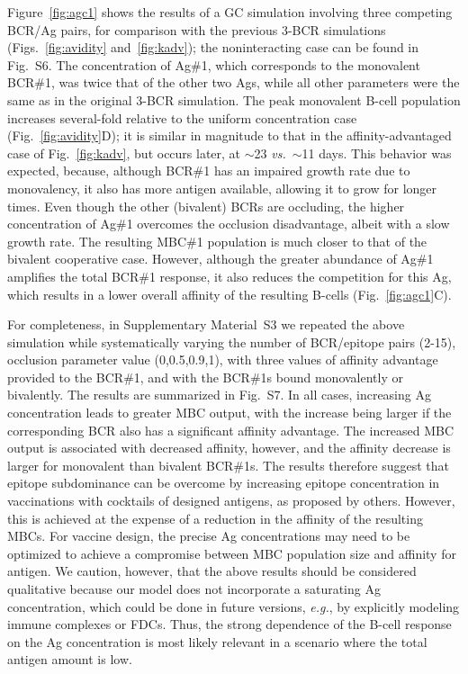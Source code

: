 \documentclass[utf8]{frontiersHLTH}%
\newcommand{\cred}[1]{\textsf{\color{red}#1}}
\newcommand{\vo}[1]{#1} %
\def\eg {{\it e.g.}}
\def\vs {{\it vs.}}
\newcommand{\fig}[1]{Fig.~\ref{fig:#1}}
\newcommand{\figs}[2]{Figs.~\ref{fig:#1} and~\ref{fig:#2}}
\newcommand{\Fig}[1]{Figure~\ref{fig:#1}}
\newcommand{\SI}{Supplementary Material}
\begin{document}
%
\Fig{agc1} shows the results of a GC simulation involving three
competing BCR/Ag pairs, for comparison with the previous 3-BCR simulations (\figs{avidity}{kadv});
the noninteracting case can be found in Fig.~S6.
The concentration of
Ag\#1, which corresponds to the monovalent BCR\#1, was twice that of
the other two Ags, while all other parameters were the same as in the
original 3-BCR simulation. The peak monovalent
B-cell population increases several-fold relative to the uniform concentration
case (\fig{avidity}D); it is similar in magnitude to that in the
affinity-advantaged case of \fig{kadv}, but occurs later, at $\sim$23 \vs~$\sim$11 days. This
behavior was expected, because, although BCR\#1 has an impaired
growth rate due to monovalency, it also has more antigen available, allowing it
to grow for longer times. Even though the other (bivalent) BCRs are
occluding, the higher concentration of Ag\#1 overcomes the occlusion disadvantage,
albeit with a slow growth rate. The resulting MBC\#1 population
is much closer to that of the bivalent cooperative case.
However, although the greater abundance of Ag\#1 amplifies the total BCR\#1
response, it also reduces the competition for this Ag, which results in
a lower overall affinity of the resulting B-cells (\fig{agc1}C).

For completeness, in \SI~S3 we repeated the above simulation while systematically varying the
number of BCR/epitope pairs \vo{(2-15)}, occlusion parameter value \vo{(0,0.5,0.9,1)}, with
three values of affinity advantage provided to the
BCR\#1, and with the BCR\#1s bound monovalently or bivalently. The results are summarized in Fig.~S7.
In all cases, increasing Ag concentration leads to
greater MBC output, with the increase being larger if the
corresponding BCR also has a significant affinity advantage.
The increased MBC output is associated with decreased affinity, however, and the affinity decrease
is larger for monovalent than bivalent
BCR\#1s. The results therefore suggest that
epitope subdominance can be overcome by increasing epitope concentration
in vaccinations with cocktails of designed antigens, as proposed by
others.\cite{kanekiyo19,cohen21,glanville20}  However, this is \vo{achieved} at the expense of a
reduction in the affinity of the resulting MBCs.
For vaccine design, the precise Ag concentrations may need to be 
optimized to achieve a compromise between MBC population
size and affinity for antigen.
%
\cred{
We caution, however, that the above results should be considered qualitative
because our model does not incorporate a saturating Ag concentration, which could be done 
in future versions, \eg, by explicitly modeling immune complexes or FDCs.
Thus, the strong dependence of the B-cell response on the Ag concentration
is most likely relevant in a scenario where the total antigen amount is low.
}
\end{document}
